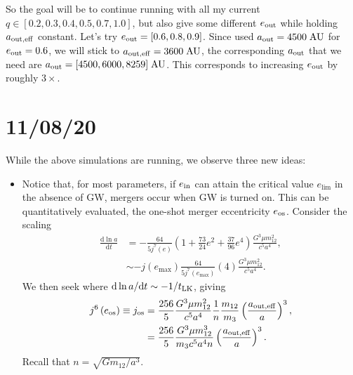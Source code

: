 \documentclass[11pt,
        usenames, %
        dvipsnames %
    ]{article}
\newcommand*{\rd}[2]{\frac{\mathrm{d}#1}{\mathrm{d}#2}}
\newcommand*{\rdil}[2]{\mathrm{d}#1 / \mathrm{d}#2}
\newcommand*{\p}[1]{\left(#1\right)}
\begin{document}
So the goal will be to continue running with all my current $q \in [0.2, 0.3,
0.4, 0.5, 0.7, 1.0]$, but also give some different $e_{\rm out}$ while holding
$a_{\rm out, eff}$ constant. Let's try $e_{\rm out} = [0.6, 0.8, 0.9]$. Since
used $a_{\rm out} = 4500\;\mathrm{AU}$ for $e_{\rm out} = 0.6$, we will stick to
$a_{\rm out, eff} = 3600\;\mathrm{AU}$, the corresponding $a_{\rm out}$ that we
need are $a_{\rm out} = [4500, 6000, 8259]\;\mathrm{AU}$. This corresponds to
increasing $e_{\rm out}$ by roughly $3\times$.

\section{11/08/20}

While the above simulations are running, we observe three new ideas:
\begin{itemize}
    \item Notice that, for most parameters, if $e_{\rm in}$ can attain the
        critical value $e_{\lim}$ in the absence of GW, mergers occur when GW
        is turned on. This can be quantitatively evaluated, the one-shot merger
        eccentricity $e_{\rm os}$. Consider the scaling
        \begin{align}
            \rd{\ln a}{t} &= -\frac{64}{5j^7(e)}\p{1 + \frac{73}{24}e^2 +
                \frac{37}{96}e^4}\frac{G^3 \mu m_{12}^2}{c^5a^4},\\
                &\sim -j\p{e_{\max}}\frac{64}{5j^7(e_{\max})}
                    (4) \frac{G^3\mu m_{12}^2}{c^5a^4}.
        \end{align}
        We then seek where $\rdil{\ln a}{t} \sim -1 / t_{\rm LK}$, giving
        \begin{align}
            j^6\p{e_{\rm os}} \equiv j_{\rm os}
                &= \frac{256}{5}\frac{G^3 \mu m_{12}^2}{c^5a^4}
                    \frac{1}{n}\frac{m_{12}}{m_3}\p{\frac{a_{\rm out,
                    eff}}{a}}^3,\\
                &= \frac{256}{5}\frac{G^3 \mu m_{12}^3}{m_3c^5a^4n}
                    \p{\frac{a_{\rm out, eff}}{a}}^3.
        \end{align}
        Recall that $n = \sqrt{Gm_{12} / a^3}$.


\end{itemize}
\end{document}
